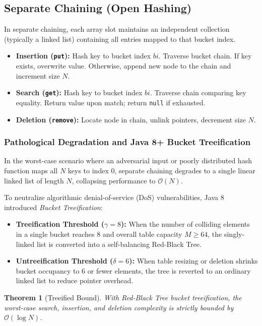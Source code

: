 \documentclass[10pt,twocolumn,letterpaper]{article}
\newtheorem{theorem}{Theorem}
\begin{document}
\subsection{Separate Chaining (Open Hashing)}
In separate chaining, each array slot maintains an independent collection (typically a linked list) containing all entries mapped to that bucket index.
\begin{itemize}
    \item \textbf{Insertion (\texttt{put}):} Hash key to bucket index $bi$. Traverse bucket chain. If key exists, overwrite value. Otherwise, append new node to the chain and increment size $N$.
    \item \textbf{Search (\texttt{get}):} Hash key to bucket index $bi$. Traverse chain comparing key equality. Return value upon match; return \texttt{null} if exhausted.
    \item \textbf{Deletion (\texttt{remove}):} Locate node in chain, unlink pointers, decrement size $N$.
\end{itemize}

\subsubsection{Pathological Degradation and Java 8+ Bucket Treeification}
In the worst-case scenario where an adversarial input or poorly distributed hash function maps all $N$ keys to index 0, separate chaining degrades to a single linear linked list of length $N$, collapsing performance to $\mathcal{O}(N)$.

To neutralize algorithmic denial-of-service (DoS) vulnerabilities, Java 8 introduced \emph{Bucket Treeification}:
\begin{itemize}
    \item \textbf{Treeification Threshold ($\gamma = 8$):} When the number of colliding elements in a single bucket reaches 8 and overall table capacity $M \ge 64$, the singly-linked list is converted into a self-balancing Red-Black Tree.
    \item \textbf{Untreeification Threshold ($\delta = 6$):} When table resizing or deletion shrinks bucket occupancy to 6 or fewer elements, the tree is reverted to an ordinary linked list to reduce pointer overhead.
\end{itemize}

\begin{theorem}[Treeified Bound]
With Red-Black Tree bucket treeification, the worst-case search, insertion, and deletion complexity is strictly bounded by $\mathcal{O}(\log N)$.
\end{theorem}
\end{document}
